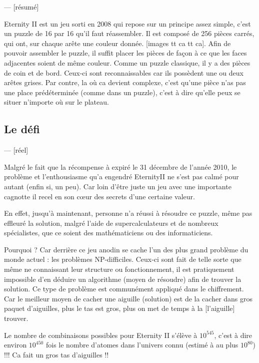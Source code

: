 	
	--- [résumé]
	
	Eternity II est un jeu sorti en 2008 qui repose sur un principe assez simple, c'est un puzzle de 16 par 16 qu'il faut réassembler. Il est composé de 256 pièces carrés, qui ont, sur chaque arête une couleur donnée. [images tt ca tt ca]. Afin de pouvoir assembler le puzzle, il suffit placer les pièces de façon à ce que les faces adjacentes soient de même couleur. Comme un puzzle classique, il y a des pièces de coin et de bord. Ceux-ci sont reconnaissables car ils possèdent une ou deux arêtes grises. Par contre, la où ca devient complexe, c'est qu'une pièce n'as pas une place prédéterminée (comme dans un puzzle), c'est à dire qu'elle peux se situer n'importe où sur le plateau. 
	
	\subsection{Le défi}
	--- [réel]
	
	Malgré le fait que la récompense à expiré le 31 décembre de l'année 2010, le problème et l'enthousiasme qu'a engendré EternityII ne s'est pas calmé pour autant (enfin si, un peu). Car loin d'être juste un jeu avec une importante cagnotte il recel en son c\oe ur des secrets d'une certaine valeur.
	
	En effet, jusqu'à maintenant, personne n'a réussi à résoudre ce puzzle, même pas effleuré la solution, malgré l'aide de supercalculateurs et de nombreux spécialistes, que ce soient des mathématiciens ou des informaticiens.
	
	Pourquoi ? Car derrière ce jeu anodin se cache l'un des plus grand problème du monde actuel : les problèmes NP-difficiles. Ceux-ci sont fait de telle sorte que même ne connaissant leur structure ou fonctionnement, il est pratiquement impossible d'en déduire un algorithme (moyen de résoudre) afin de trouver la solution. Ce type de problème est communément appliqué dans le chiffrement. Car le meilleur moyen de cacher une aiguille (solution) est de la cacher dans gros paquet d'aiguilles, plus le tas est gros, plus on met de temps à la [l'aiguille] trouver.
	
	\begin{exmp}
		Le nombre de combinaisons possibles pour Eternity II s'élève à $10^{545}$, c'est à dire environ $10^{450}$ fois le nombre d'atomes dans l'univers connu (estimé à au plus $10^{80}$) !!! Ca fait un gros tas d'aiguilles !!
	\end{exmp}
		
